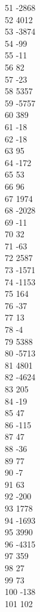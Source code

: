 { 51	-2868 \\
 52	4012 \\
 53	-3874 \\
 54	-99 \\
 55	-11 \\
 56	82 \\
 57	-23 \\
 58	5357 \\
 59	-5757 \\
 60	389 \\
 61	-18 \\
 62	-18 \\
 63	95 \\
 64	-172 \\
 65	53 \\
 66	96 \\
 67	1974 \\
 68	-2028 \\
 69	-11 \\
 70	32 \\
 71	-63 \\
 72	2587 \\
 73	-1571 \\
 74	-1153 \\
 75	164 \\
 76	-37 \\
 77	13 \\
 78	-4 \\
 79	5388 \\
 80	-5713 \\
 81	4801 \\
 82	-4624 \\
 83	205 \\
 84	-19 \\
 85	47 \\
 86	-115 \\
 87	47 \\
 88	-36 \\
 89	77 \\
 90	-7 \\
 91	63 \\
 92	-200 \\
 93	1778 \\
 94	-1693 \\
 95	3990 \\
 96	-4315 \\
 97	359 \\
 98	27 \\
 99	73 \\
 100	-138 \\
 101	102 \\
}
